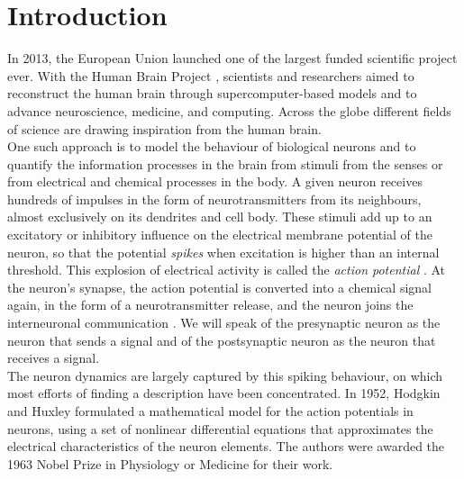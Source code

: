 \newpage
\section{Introduction} \label{sec:Introduction}
In 2013, the European Union launched one of the largest funded scientific project ever. With the Human Brain Project \cite{humanbrainproject}, scientists and researchers aimed to reconstruct the human brain through supercomputer-based models and to advance neuroscience, medicine, and computing. Across the globe different fields of science are drawing inspiration from the human brain. \\

One such approach is to model the behaviour of biological neurons and to quantify the information processes in the brain from stimuli from the senses or from electrical and chemical processes in the body. A given neuron receives hundreds of impulses in the form of neurotransmitters from its neighbours, almost exclusively on its dendrites and cell body. These stimuli add up to an excitatory or inhibitory influence on the electrical membrane potential of the neuron, so that the potential \textsl{spikes} when excitation is higher than an internal threshold. This explosion of electrical activity is called the \textsl{action potential} \cite{IntroductionModelingDynamics}. At the neuron's synapse, the action potential is converted into a chemical signal again, in the form of a neurotransmitter release, and the neuron joins the interneuronal communication \cite{ActionPotentialsAndSynapses}. %
We will speak of the presynaptic neuron as the neuron that sends a signal and of the postsynaptic neuron as the neuron that receives a signal. \\



The neuron dynamics are largely captured by this spiking behaviour, on which most efforts of finding a description have been concentrated.
In 1952, Hodgkin and Huxley formulated a mathematical model for the action potentials in neurons, using a set of nonlinear differential equations that approximates the electrical characteristics of the neuron elements. The authors were awarded the 1963 Nobel Prize in Physiology or Medicine \cite{nobel1963} for their work.\\

